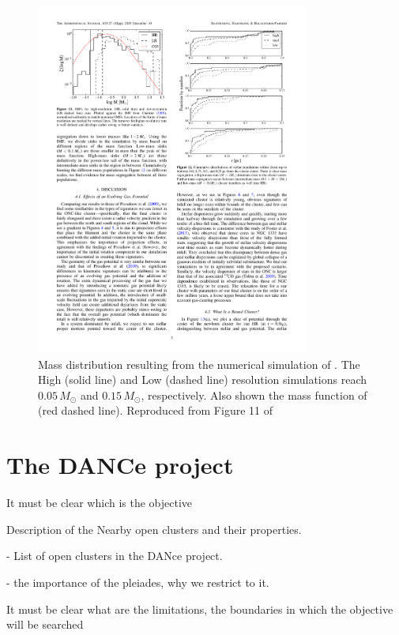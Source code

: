 \begin{figure}[htbp]
\begin{center}
\includegraphics[width=0.8\textwidth]{background/Figures/F11_Kuznetsova2015.pdf}
\caption{Mass distribution resulting from the numerical simulation of \citet{2015ApJ...815...27K}. The High (solid line) and Low (dashed line) resolution simulations reach $0.05\, M_{\odot}$ and $0.15\, M_{\odot}$, respectively. Also shown the mass function of \citet{Chabrier2005} (red dashed line). Reproduced from Figure 11 of \citet{2015ApJ...815...27K}}
\label{fig:IMFKuznetsova}
\end{center}
\end{figure}

\section{The DANCe project}
\label{sect:DANCeproject}
It must be clear which is the objective

Description of the Nearby open clusters and their properties.

- List of open clusters in the DANce project.

- the importance of the pleiades, why we restrict to it.

It must be clear what are the limitations, the boundaries in which the objective will be searched

